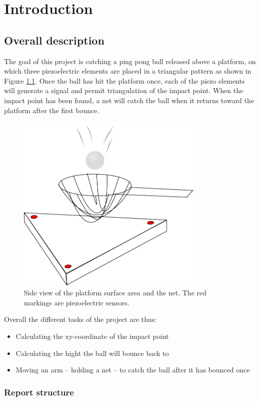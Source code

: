 \chapter{Introduction}
\label{chap:introduction}

\section{Overall description}
The goal of this project is catching a ping pong ball released above a platform, on which three piezoelectric elements are placed in a triangular pattern as shown in Figure \ref{fig:sideview}. Once the ball has hit the platform once, each of the piezo elements will generate a signal and permit triangulation of the impact point. When the impact point has been found, a net will catch the ball when it returns toward the platform after the first bounce.

\begin{figure}[htb]
	\centering
	\includegraphics[width=0.8\textwidth]{figures/sideview}
	\caption{Side view of the platform surface area and the net. The red markings are piezoelectric sensors.}
	\label{fig:sideview}
\end{figure}

Overall the different tasks of the project are thus:
\begin{itemize}
	\item Calculating the xy-coordinate of the impact point
	\item Calculating the hight the ball will bounce back to
	\item Moving an arm -- holding a net -- to catch the ball after it has bounced once
\end{itemize}

\subsection{Report structure}
